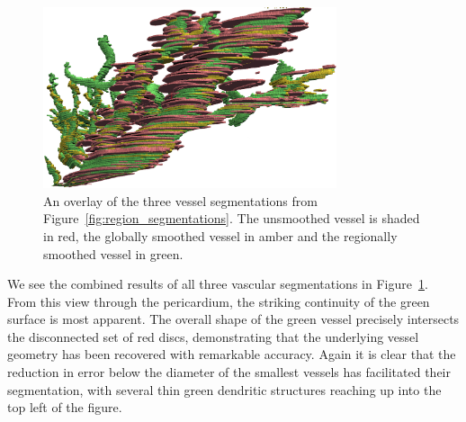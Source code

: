   \begin{figure}[!t]
    \centering
    \includegraphics[width=3.4in]{3_results/Figs/vessel_overlay}
    \caption{An overlay of the three vessel segmentations from Figure~\ref{fig:region_segmentations}. The unsmoothed vessel is shaded in red, the globally smoothed vessel in amber and the regionally smoothed vessel in green.}
    \label{fig:vessel_segmentations}
  \end{figure} 
      We see the combined results of all three vascular segmentations in Figure~\ref{fig:vessel_segmentations}. From this view through the pericardium, the striking continuity of the green surface is most apparent. The overall shape of the green vessel precisely intersects the disconnected set of red discs, demonstrating that the underlying vessel geometry has been recovered with remarkable accuracy. Again it is clear that the reduction in error below the diameter of the smallest vessels has facilitated their segmentation, with several thin green dendritic structures reaching up into the top left of the figure.  
